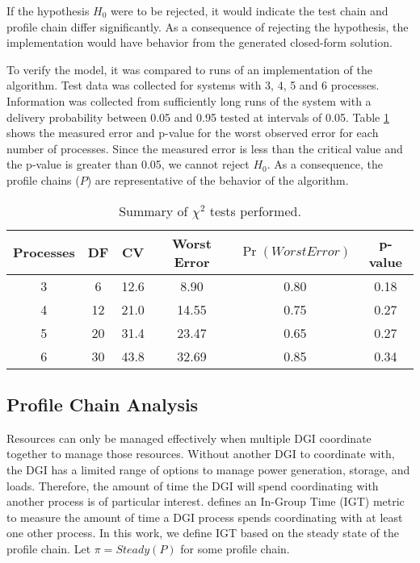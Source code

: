 If the hypothesis $H_{0}$ were to be rejected, it would indicate the test chain and profile chain differ significantly.
As a consequence of rejecting the hypothesis, the implementation would have behavior from the generated closed-form solution.

To verify the model, it was compared to runs of an implementation of the algorithm.
Test data was collected for systems with 3, 4, 5 and 6 processes.
Information was collected from sufficiently long runs of the system with a delivery probability between 0.05 and 0.95 tested at intervals of 0.05.
Table \ref{tab:chisummary} shows the measured error and p-value for the worst observed error for each number of processes.
Since the measured error is less than the critical value and the p-value is greater than 0.05, we cannot reject $H_0$. 
As a consequence, the profile chains ($P$) are representative of the behavior of the algorithm.

\begin{table}
\centering
\caption{Summary of $\chi^2$ tests performed.}
\begin{tabular}{ c | c c c c c}
  \hline
  Processes & DF & CV & Worst Error & $\Pr(WorstError)$ &  p-value \\ \hline
  3 & 6 & 12.6 & 8.90 & 0.80 & 0.18 \\
  4 & 12 & 21.0 & 14.55 & 0.75 & 0.27 \\
  5 & 20 & 31.4 & 23.47 & 0.65 & 0.27 \\
  6 & 30 & 43.8 & 32.69 & 0.85 & 0.34 \\
\end{tabular}

\label{tab:chisummary}
\end{table}

\subsection{Profile Chain Analysis}

Resources can only be managed effectively when multiple \ac{DGI} coordinate together to manage those resources.
Without another DGI to coordinate with, the DGI has a limited range of options to manage power generation, storage, and loads.
Therefore, the amount of time the DGI will spend coordinating with another process is of particular interest.
\cite{CRITIS2012} defines an In-Group Time (IGT) metric to measure the amount of time a DGI process spends coordinating with at least one other process.
In this work, we define \ac{IGT} based on the steady state of the profile chain.
Let $\pi=Steady(P)$ for some profile chain.


